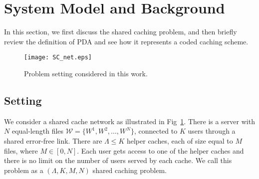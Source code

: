 \documentclass[conference,a4paper,10pt]{IEEEtran}
\begin{document}
\section{System Model and Background}
% 
In this section, we first discuss the shared caching problem, and then briefly review the definition of PDA and see how it represents a coded caching scheme.

\begin{figure}[t!]
	\begin{center}
		\captionsetup{justification=centering}
		\texttt{[image: SC\_net.eps]}
		\caption{Problem setting considered in this work.}
		\label{fig:setting}
	\end{center}
\end{figure}


\subsection{Setting}
We consider a shared cache network as illustrated in Fig~\ref{fig:setting}. There is a server with $N$ equal-length files $\mathcal{W}=\{W^1, W^2,\ldots, W^N\}$, connected to $K$ users through a shared error-free link. There are $\Lambda\leq K$ helper caches, each of size equal to $M$ files, where $M \in [0,N]$. Each user gets access to one of the helper caches and there is no limit on the number of users served by each cache. We call this problem as a $(\Lambda, K, M, N )$ shared caching problem.
 
\end{document}
